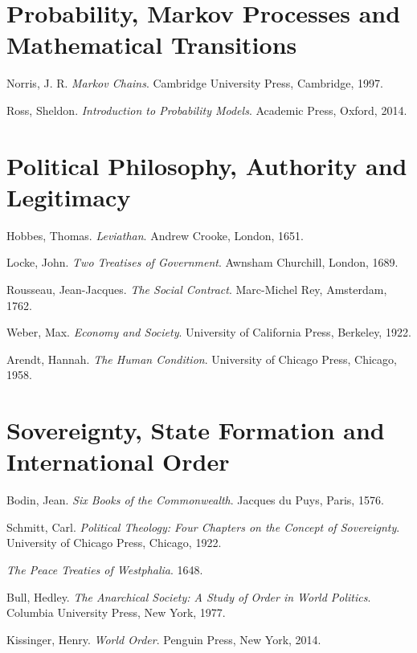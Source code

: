 \documentclass[11pt,openany]{book}
\theoremstyle{plain}
\theoremstyle{definition}
\begin{document}
\section*{Probability, Markov Processes and Mathematical Transitions}

Norris, J. R.
\textit{Markov Chains}.
Cambridge University Press, Cambridge, 1997.

Ross, Sheldon.
\textit{Introduction to Probability Models}.
Academic Press, Oxford, 2014.


\section*{Political Philosophy, Authority and Legitimacy}

Hobbes, Thomas.
\textit{Leviathan}.
Andrew Crooke, London, 1651.

Locke, John.
\textit{Two Treatises of Government}.
Awnsham Churchill, London, 1689.

Rousseau, Jean-Jacques.
\textit{The Social Contract}.
Marc-Michel Rey, Amsterdam, 1762.

Weber, Max.
\textit{Economy and Society}.
University of California Press, Berkeley, 1922.

Arendt, Hannah.
\textit{The Human Condition}.
University of Chicago Press, Chicago, 1958.


\section*{Sovereignty, State Formation and International Order}

Bodin, Jean.
\textit{Six Books of the Commonwealth}.
Jacques du Puys, Paris, 1576.

Schmitt, Carl.
\textit{Political Theology: Four Chapters on the Concept of Sovereignty}.
University of Chicago Press, Chicago, 1922.

\textit{The Peace Treaties of Westphalia}.
1648.

Bull, Hedley.
\textit{The Anarchical Society: A Study of Order in World Politics}.
Columbia University Press, New York, 1977.

Kissinger, Henry.
\textit{World Order}.
Penguin Press, New York, 2014.

\end{document}
